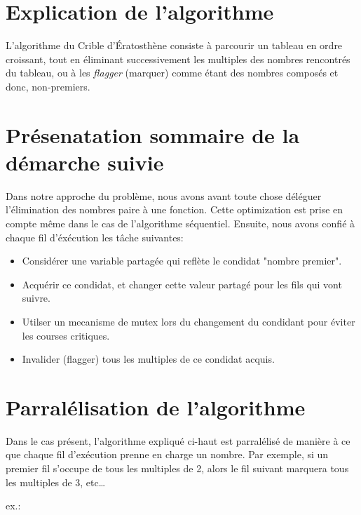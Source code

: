 \documentclass{report}
\begin{document}
	\section{Explication de l'algorithme}

		L'algorithme du Crible d'Ératosthène consiste à parcourir un tableau
		en ordre croissant, tout en éliminant successivement les multiples des
		nombres rencontrés du tableau, ou à les {\it flagger} (marquer) comme
		étant des nombres composés et donc, non-premiers.
	\section{Présenatation sommaire de la démarche suivie}
		Dans notre approche du problème, nous avons avant toute chose déléguer l'élimination des nombres paire à
		une fonction. Cette optimization est prise en compte même dans le cas de l'algorithme séquentiel.
		Ensuite, nous avons confié à chaque fil d'éxécution les tâche suivantes:
		\begin{itemize}
			\item Considérer une variable partagée qui reflète le condidat "nombre premier".
			\item Acquérir ce condidat, et changer cette valeur partagé pour les fils qui vont suivre.
			\item Utilser un mecanisme de mutex lors du changement du condidant pour éviter les courses critiques.
			\item Invalider (flagger) tous les multiples de ce condidat acquis.
		\end{itemize}
	\bigskip
	\section{Parralélisation de l'algorithme}
		Dans le cas présent, l'algorithme expliqué ci-haut est parralélisé de
		manière à ce que chaque fil d'exécution prenne en charge un nombre.
		Par exemple, si un premier fil s'occupe de tous les multiples de 2,
		alors le fil suivant marquera tous les multiples de 3, etc\ldots

		\bigskip
		\noindent ex.:
\end{document}
